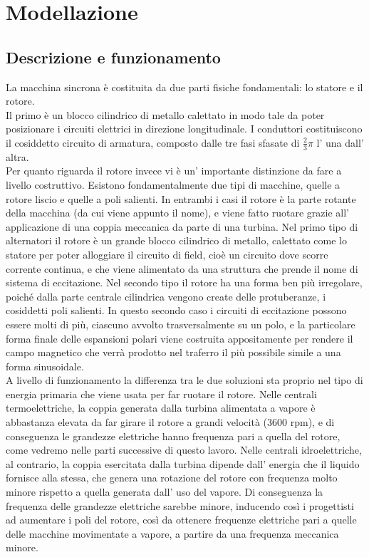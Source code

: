 \documentclass[Lau,noexaminfo]{sapthesis}
\begin{document}
	\section{Modellazione}
	\subsection{Descrizione e funzionamento}
	La macchina sincrona è costituita da due parti fisiche fondamentali: lo statore e il rotore.\\
	Il primo è un blocco cilindrico di metallo calettato in modo tale da poter posizionare i circuiti elettrici in direzione longitudinale. I conduttori costituiscono il cosiddetto circuito di armatura, composto dalle tre fasi sfasate di $\frac{2}{3}\pi$ l' una dall' altra.\\
	Per quanto riguarda il rotore invece vi è un' importante distinzione da fare a livello costruttivo. Esistono fondamentalmente due tipi di macchine, quelle a rotore liscio e quelle a poli salienti. In entrambi i casi il rotore è la parte rotante della macchina (da cui viene appunto il nome), e viene fatto ruotare grazie all' applicazione di una coppia meccanica da parte di una turbina. Nel primo tipo di alternatori il rotore è un grande blocco cilindrico di metallo, calettato come lo statore per poter alloggiare il circuito di field, cioè un circuito dove scorre corrente continua, e che viene alimentato da una struttura che prende il nome di sistema di eccitazione. Nel secondo tipo il rotore ha una forma ben più irregolare, poiché dalla parte centrale cilindrica vengono create delle protuberanze, i cosiddetti poli salienti. In questo secondo caso i circuiti di eccitazione possono essere molti di più, ciascuno avvolto trasversalmente su un polo, e la particolare forma finale delle espansioni polari viene costruita appositamente per rendere il campo magnetico che verrà prodotto nel traferro il più possibile simile a una forma sinusoidale.\\
	A livello di funzionamento la differenza tra le due soluzioni sta proprio nel tipo di energia primaria che viene usata per far ruotare il rotore. Nelle centrali termoelettriche, la coppia generata dalla turbina alimentata a vapore è abbastanza elevata da far girare il rotore a grandi velocità (3600 rpm), e di conseguenza le grandezze elettriche hanno frequenza pari a quella del rotore, come vedremo nelle parti successive di questo lavoro. Nelle centrali idroelettriche, al contrario, la coppia esercitata dalla turbina dipende dall' energia che il liquido fornisce alla stessa, che genera una rotazione del rotore con frequenza molto minore rispetto a quella generata dall' uso del vapore. Di conseguenza la frequenza delle grandezze elettriche sarebbe minore, inducendo così i progettisti ad aumentare i poli del rotore, così da ottenere frequenze elettriche pari a quelle delle macchine movimentate a vapore, a partire da una frequenza meccanica minore.
\end{document}
